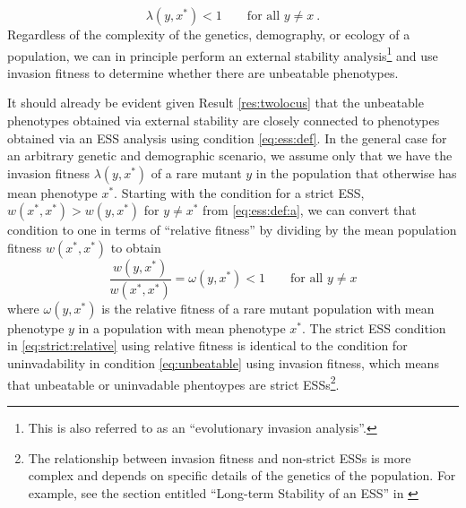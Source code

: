 \documentclass[11pt]{article}
\newcommand{\ess}[1]{#1^*}
\newcommand{\eig}{\lambda}
\begin{document}
\begin{equation}
  \label{eq:unbeatable}
  \eig(y, \ess{x}) < 1 \qquad \text{for all } y \ne x \: .
\end{equation}
Regardless of the complexity of the genetics, demography, or ecology of a population, we can in principle perform an external stability analysis\footnote{This is also referred to as an ``evolutionary invasion analysis''.} and use invasion fitness to determine whether there are unbeatable phenotypes.

It should already be evident given Result \ref{res:twolocus} that the unbeatable phenotypes obtained via external stability are closely connected to phenotypes obtained via an ESS analysis using condition \eqref{eq:ess:def}. In the general case for an arbitrary genetic and demographic scenario, we assume only that we have the invasion fitness $\eig(y, \ess{x})$ of a rare mutant $y$ in the population that otherwise has mean phenotype $\ess{x}$. Starting with the condition for a strict ESS, $w(\ess{x}, \ess{x}) > w(y, \ess{x})$ for $y \ne \ess{x}$ from \eqref{eq:ess:def:a}, we can convert that condition to one in terms of ``relative fitness'' by dividing by the mean population fitness $w(\ess{x}, \ess{x})$ to obtain
\begin{equation}
  \label{eq:strict:relative}
  \frac{w(y, \ess{x})}{w(\ess{x}, \ess{x})} = \omega(y, \ess{x}) < 1 \qquad \text{for all } y \ne x
\end{equation}
where $\omega(y, \ess{x})$ is the relative fitness of a rare mutant population with mean phenotype $y$ in a population with mean phenotype $\ess{x}$. The strict ESS condition in \eqref{eq:strict:relative} using relative fitness is identical to the condition for uninvadability in condition \eqref{eq:unbeatable} using invasion fitness, which means that unbeatable or uninvadable phentoypes are strict ESSs\footnote{The relationship between invasion fitness and non-strict ESSs is more complex and depends on specific details of the genetics of the population. For example, see the section entitled ``Long-term Stability of an ESS'' in \cite{Eshel:Feldman:1998}}.
\end{document}
